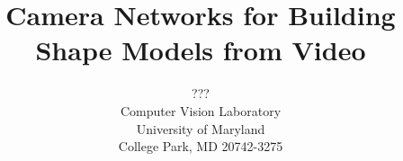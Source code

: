 \documentclass[10pt,twocolumn]{article}
\begin{document}
\title{Camera Networks for Building Shape Models from Video}
\author{???\\
Computer Vision Laboratory\\
University of Maryland\\
College Park, MD  20742-3275\\
}
\maketitle


\end{document}

